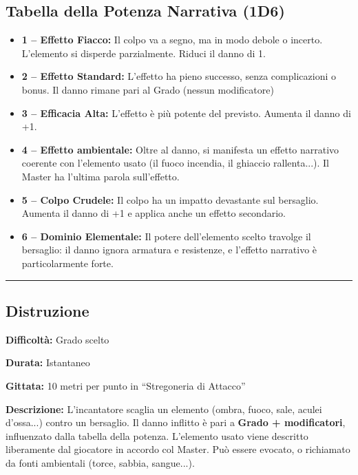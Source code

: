 \documentclass[./magie.tex]{subfiles}
\begin{document}
\subsection*{Tabella della Potenza Narrativa (1D6)}
\begin{itemize}
\item \textbf{1 – Effetto Fiacco:} Il colpo va a segno, ma in modo debole o incerto. L’elemento si disperde parzialmente. Riduci il danno di 1.
\item \textbf{2 – Effetto Standard:} L’effetto ha pieno successo, senza complicazioni o bonus. Il danno rimane pari al Grado (nessun modificatore)
\item \textbf{3 – Efficacia Alta:} L’effetto è più potente del previsto. Aumenta il danno di +1.
\item \textbf{4 – Effetto ambientale:} Oltre al danno, si manifesta un effetto narrativo coerente con l’elemento usato (il fuoco incendia, il ghiaccio rallenta...). Il Master ha l’ultima parola sull’effetto.
\item \textbf{5 – Colpo Crudele:} Il colpo ha un impatto devastante sul bersaglio. Aumenta il danno di +1 e applica anche un effetto secondario.
\item \textbf{6 – Dominio Elementale:} Il potere dell’elemento scelto travolge il bersaglio: il danno ignora armatura e resistenze, e l’effetto narrativo è particolarmente forte.
\end{itemize}


\vspace{0.2cm}
\noindent
\begin{center}
\rule{\textwidth}{0.4pt} 
\end{center}
\vspace{0.2cm}

\subsection*{Distruzione}
\begin{description}
\item \textbf{Difficoltà:} Grado scelto
\item \textbf{Durata:} Istantaneo
\item \textbf{Gittata:} 10 metri per punto in “Stregoneria di Attacco”
\item \textbf{Descrizione:} L’incantatore scaglia un elemento (ombra, fuoco, sale, aculei d’ossa...) contro un bersaglio. Il danno inflitto è pari a \textbf{Grado + modificatori}, influenzato dalla tabella della potenza. L’elemento usato viene descritto liberamente dal giocatore in accordo col Master. Può essere evocato, o richiamato da fonti ambientali (torce, sabbia, sangue...).
\end{description}
\end{document}
